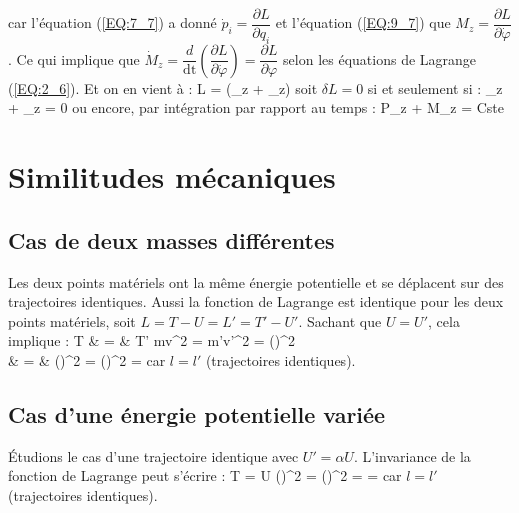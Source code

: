 \begin{itemize}
		\ee
		car l'\'equation (\ref{EQ:7_7}) a donn\'e $\dot{p}_{i} = \dfrac{\partial L}{\partial q_{i}}$ et l'\'equation (\ref{EQ:9_7}) que $M_{z} = \dfrac{\partial L}{\partial\dot{\varphi}}$. Ce qui implique que $\dot{M}_{z} = \dfrac{d}{\mathrm{dt}}\left(\dfrac{\partial L}{\partial\dot{\varphi}}\right) = \dfrac{\partial L}{\partial\varphi}$ selon les \'equations de Lagrange (\ref{EQ:2_6}). Et on en vient \`a :
		\be
			\forall \delta\varphi\text{, }\delta L = \delta\varphi\left(_{z} + _{z}\right)
		\ee
		soit $\delta L = 0$ si et seulement si :
		\be
			_{z} + _{z} = 0
		\ee
		ou encore, par int\'egration par rapport au temps :
		\be
			P_{z} + M_{z} = Cste
		\ee
\end{itemize}

\section{Similitudes m\'ecaniques}

\subsection{Cas de deux masses diff\'erentes}

Les deux points mat\'eriels ont la m\^eme \'energie potentielle et se d\'eplacent sur des trajectoires identiques. Aussi la fonction de Lagrange est identique pour les deux points mat\'eriels, soit $L = T - U = L' = T' - U'$. Sachant que $U=U'$, cela implique :
\bea
	T & = & T' \Leftrightarrow {}mv^{2} = m'v'^{2} \Leftrightarrow {} = \left(\right)^{2} \nonumber \\
	\Leftrightarrow {} & = & \left(\right)^{2} \Leftrightarrow {} = \left(\right)^{2} \Leftrightarrow {} = 
\eea
car $l=l'$ (trajectoires identiques).

\subsection{Cas d'une \'energie potentielle vari\'ee}

\'Etudions le cas d'une trajectoire identique avec $U' = \alpha U$. L'invariance de la fonction de Lagrange peut s'\'ecrire :
\be
	\delta T = \delta U \Leftrightarrow \left(\right)^{2} =  \Leftrightarrow \left(\right)^{2} =  \Leftrightarrow {} = 
\ee
car $l=l'$ (trajectoires identiques).